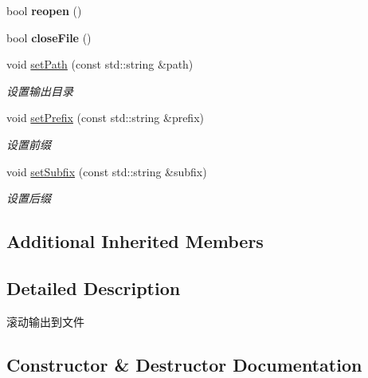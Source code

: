 \begin{DoxyCompactItemize}
bool {\bfseries reopen} ()
\item 
\mbox{\label{classDAQ_1_1RollFileAppender_ae88455f339cae96ab90016d89f9ded95}} 
bool {\bfseries close\+File} ()
\item 
void \hyperlink{classDAQ_1_1RollFileAppender_a61d55f46b0226a36a7f33fa6580525ab}{set\+Path} (const std\+::string \&path)
\begin{DoxyCompactList}\small\item\em 设置输出目录 \end{DoxyCompactList}\item 
void \hyperlink{classDAQ_1_1RollFileAppender_a068d8104f4c0ac82feadfd23520b402e}{set\+Prefix} (const std\+::string \&prefix)
\begin{DoxyCompactList}\small\item\em 设置前缀 \end{DoxyCompactList}\item 
void \hyperlink{classDAQ_1_1RollFileAppender_a15303e8f223e7b279f0a3cd97e699e2e}{set\+Subfix} (const std\+::string \&subfix)
\begin{DoxyCompactList}\small\item\em 设置后缀 \end{DoxyCompactList}\end{DoxyCompactItemize}
\subsection*{Additional Inherited Members}


\subsection{Detailed Description}
滚动输出到文件 

\subsection{Constructor \& Destructor Documentation}
\mbox{\label{classDAQ_1_1RollFileAppender_a9ca22efe9d46c9b6a2640ca62ae5574e}} 
